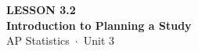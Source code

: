 \documentclass[aspectratio=169, 11pt]{beamer}
\begin{document}
{
\begin{frame}[plain]
  \vspace{2.8cm}\hspace{0.55cm}%
  \begin{minipage}{0.9\textwidth}
    {\color{goldacc}\bfseries\small LESSON 3.2}\\[0.5cm]
    {\color{white}\bfseries\LARGE Introduction to Planning a Study}\\[1.2cm]
    {\color{skymid}\small AP Statistics~$\cdot$~Unit 3}
  \end{minipage}
\end{frame}
}

\begin{frame}[t, plain]
\end{frame}
\end{document}
